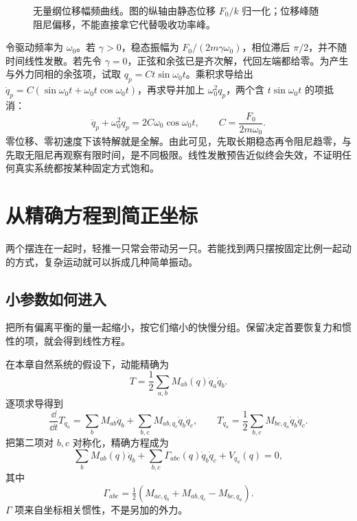 \begin{figure}[htbp]
\centering
{}
\caption{无量纲位移幅频曲线。图的纵轴由静态位移 $F_0/k$ 归一化；位移峰随阻尼偏移，不能直接拿它代替吸收功率峰。}
\label{fig:resonance-osc}
\end{figure}

\begin{example}[有限阻尼响应与无阻尼共振]
令驱动频率为 $\omega_0$。若 $\gamma>0$，稳态振幅为 $F_0/(2m\gamma\omega_0)$，相位滞后 $\pi/2$，并不随时间线性发散。若先令 $\gamma=0$，正弦和余弦已是齐次解，代回左端都给零。为产生与外力同相的余弦项，试取 $q_p=Ct\sin\omega_0t$。乘积求导给出 $\dot q_p=C(\sin\omega_0t+\omega_0t\cos\omega_0t)$，再求导并加上 $\omega_0^2q_p$，两个含 $t\sin\omega_0t$ 的项抵消：
\[
\ddot q_p+\omega_0^2q_p=2C\omega_0\cos\omega_0t,
\qquad C=\frac{F_0}{2m\omega_0}.
\]
零位移、零初速度下该特解就是全解。由此可见，先取长期稳态再令阻尼趋零，与先取无阻尼再观察有限时间，是不同极限。线性发散预告近似终会失效，不证明任何真实系统都按某种固定方式饱和。
\end{example}


\section{从精确方程到简正坐标}
两个摆连在一起时，轻推一只常会带动另一只。若能找到两只摆按固定比例一起动的方式，复杂运动就可以拆成几种简单振动。

\subsection{小参数如何进入}
把所有偏离平衡的量一起缩小，按它们缩小的快慢分组。保留决定首要恢复力和惯性的项，就会得到线性方程。

在本章自然系统的假设下，动能精确为
\begin{equation}
T=\frac12\sum_{a,b}M_{ab}(q)\dot q_a\dot q_b.
\label{eq:exact-T-multi}
\end{equation}
逐项求导得到
\[
\frac{\dd}{\dd t}T_{\dot q_a}=\sum_b M_{ab}\ddot q_b+
\sum_{b,c}M_{ab,q_c}\dot q_b\dot q_c,\qquad
T_{q_a}=\frac12\sum_{b,c}M_{bc,q_a}\dot q_b\dot q_c.
\]
把第二项对 $b,c$ 对称化，精确方程成为
\begin{equation}
\sum_bM_{ab}(q)\ddot q_b+
\sum_{b,c}\Gamma_{abc}(q)\dot q_b\dot q_c+V_{q_a}(q)=0,
\label{eq:exact-multi-eq}
\end{equation}
其中
\[
\Gamma_{abc}=\tfrac12(M_{ac,q_b}+M_{ab,q_c}-M_{bc,q_a}).
\]
$\Gamma$ 项来自坐标相关惯性，不是另加的外力。

